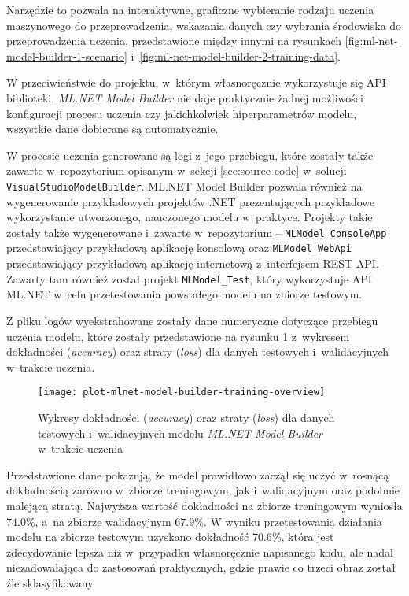 Narzędzie to pozwala na interaktywne, graficzne wybieranie rodzaju uczenia maszynowego do przeprowadzenia, wskazania danych czy wybrania środowiska do przeprowadzenia uczenia, przedstawione między innymi na rysunkach \ref{fig:ml-net-model-builder-1-scenario} i~\ref{fig:ml-net-model-builder-2-training-data}.

W przeciwieństwie do projektu, w~którym własnoręcznie wykorzystuje się API biblioteki, \emph{ML.NET Model Builder} nie daje praktycznie żadnej możliwości konfiguracji procesu uczenia czy jakichkolwiek hiperparametrów modelu, wszystkie dane dobierane są automatycznie.

W procesie uczenia generowane są logi z~jego przebiegu, które zostały także zawarte w~repozytorium opisanym w~\hyperref[sec:source-code]{sekcji \ref*{sec:source-code}} w~solucji \lstinline{VisualStudioModelBuilder}.
ML.NET Model Builder pozwala również na wygenerowanie przykładowych projektów .NET prezentujących przykładowe wykorzystanie utworzonego, nauczonego modelu w~praktyce.
Projekty takie zostały także wygenerowane i~zawarte w~repozytorium -- \lstinline{MLModel_ConsoleApp} przedstawiający przykładową aplikację konsolową oraz \lstinline{MLModel_WebApi} przedstawiający przykładową aplikację internetową z~interfejsem REST API.
Zawarty tam również został projekt \lstinline{MLModel_Test}, który wykorzystuje API ML.NET w~celu przetestowania powstałego modelu na zbiorze testowym.

Z pliku logów wyekstrahowane zostały dane numeryczne dotyczące przebiegu uczenia modelu, które zostały przedstawione na \hyperref[fig:plot-mlnet-model-builder-training-overview]{rysunku \ref*{fig:plot-mlnet-model-builder-training-overview}} z~wykresem dokładności (\emph{accuracy}) oraz straty (\emph{loss}) dla danych testowych i~walidacyjnych w~trakcie uczenia.

\begin{figure}[ht]
  \texttt{[image: plot-mlnet-model-builder-training-overview]}
  \caption[Wykresy statystyk modelu ML.NET Model Builder w~trakcie uczenia]{Wykresy dokładności (\emph{accuracy}) oraz straty (\emph{loss}) dla danych testowych i~walidacyjnych modelu \emph{ML.NET Model Builder} w~trakcie uczenia}
  \label{fig:plot-mlnet-model-builder-training-overview}
\end{figure}

Przedstawione dane pokazują, że model prawidłowo zaczął się uczyć w~rosnącą dokładnością zarówno w~zbiorze treningowym, jak i~walidacyjnym oraz podobnie malejącą stratą.
Najwyższa wartość dokładności na zbiorze treningowym wyniosła $74.0\%$, a~na zbiorze walidacyjnym $67.9\%$.
W wyniku przetestowania działania modelu na zbiorze testowym uzyskano dokładność $70.6\%$, która jest zdecydowanie lepsza niż w~przypadku własnoręcznie napisanego kodu, ale nadal niezadowalająca do zastosowań praktycznych, gdzie prawie co trzeci obraz został źle sklasyfikowany.

